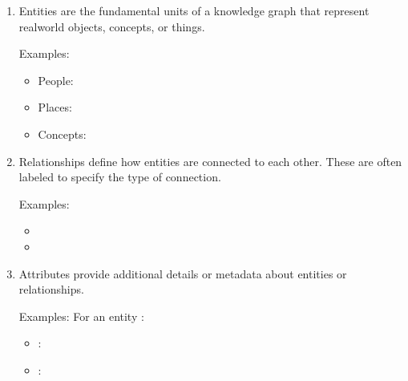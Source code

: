 \documentclass[letterpaper,11pt,english]{sphinxmanual}
\begin{document}
\begin{enumerate}
%
\item {} 
\sphinxAtStartPar
{}
Entities are the fundamental units of a knowledge graph that represent real\sphinxhyphen{}world objects, concepts, or things.

\sphinxAtStartPar
Examples:
\begin{itemize}
\item {} 
\sphinxAtStartPar
People: 

\item {} 
\sphinxAtStartPar
Places: 

\item {} 
\sphinxAtStartPar
Concepts: 

\end{itemize}

\item {} 
\sphinxAtStartPar
{}
Relationships define how entities are connected to each other. These are often labeled to specify the type of connection.

\sphinxAtStartPar
Examples:
\begin{itemize}
\item {} 
\sphinxAtStartPar
{}  

\item {} 
\sphinxAtStartPar
{}  

\end{itemize}

\item {} 
\sphinxAtStartPar
{}
Attributes provide additional details or metadata about entities or relationships.

\sphinxAtStartPar
Examples:
\sphinxhyphen{} For an entity :
\begin{itemize}
\item {} 
\sphinxAtStartPar
{}: 

\item {} 
\sphinxAtStartPar
{}: 


\end{itemize}
\end{enumerate}
\end{document}
